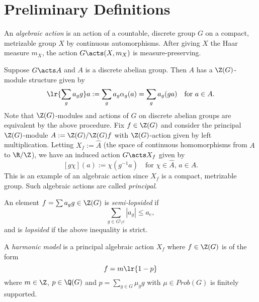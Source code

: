 \documentclass[../main.tex]{subfiles}
\begin{document}
\section{Preliminary Definitions}

\begin{definition}\label{def:algact}
    An \textit{algebraic action} is an action of a countable, discrete group $ G $ on a compact, metrizable group $ X $ by continuous automorphisms. After giving $ X $ the Haar measure $ m_{X} $, the action $ G\acts (X, m_{X}) $ is measure-preserving.
\end{definition}

Suppose $ G\acts A $ and $ A $ is a discrete abelian group. Then $ A $ has a $ \Z(G) $-module structure given by 
\[
    \lr{\sum_{g}a_{g}g} a := \sum_{g} a_{g} \alpha_{g}(a) = \sum_{g}a_{g} (ga)\quad\text{for } a\in A.
\]
Note that $ \Z(G)$-modules and actions of $ G $ on discrete abelian groups are equivalent by the above procedure. Fix $ f\in \Z(G) $ and consider the principal $ \Z(G) $-module $ A:= \Z(G)/\Z(G)f $ with $ \Z(G) $-action given by left multiplication. Letting $ X_{f}:=\widehat{A} $ (the space of continuous homomorphisms from $ A $ to $ \R/\Z $), we have an induced action $ G \acts X_{f} $ given by
\[
    [g\chi](a):= \chi(g^{-1}a) \quad \text{for } \chi\in \widehat{A},\, a\in A.
\]
This is an example of an algebraic action since $ X_{f} $ is a compact, metrizable group. Such algebraic actions are called \textit{principal}.


\begin{definition}
    An element $ f = \sum a_{g}g\in\Z(G)  $ is \textit{semi-lopsided} if 
    \[
        \sum_{g\in G\setminus {e}} |a_{g}| \leq a_{e},
    \]
    and is \textit{lopsided} if the above inequality is strict.
    
\end{definition}

\begin{definition}
    A \textit{harmonic model} is a principal algebraic action $ X_{f} $ where $ f\in \Z(G) $ is of the form 
    \[
        f = m\lr{1 - p}
    \]
    where $ m\in \Z $, $ p\in \Q(G) $ and $ p=\sum_{g\in G} \mu_{g}g$ with $ \mu\in Prob(G) $ is finitely supported.
\end{definition}
\end{document}
